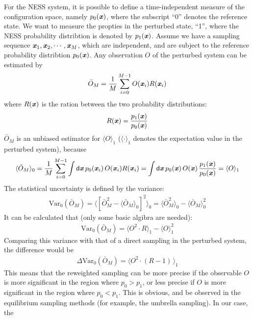 \documentclass[aip,jcp,a4paper,reprint,onecolumn]{revtex4-1}
\newcommand{\vect}[1]{\textbf{\textit{#1}}}
\newcommand{\dd}{\textsf{d}}
\begin{document}
For the NESS system, it is possible to define a time-independent
measure of the configuration space, namely $p_0(\vect x)$, where
the subscript ``0'' denotes the reference state. We want to measure
the propties in the perturbed state, ``1'', where the NESS
probability distribtion is denoted by $p_1(\vect x)$. Assume we have
a sampling sequence $\vect x_1, \vect x_2, \cdots, \vect x_M$, which
are independent, and are subject to the reference probability distribtion
$p_0(\vect x)$. Any  observation $O$ of the perturbed system can be
estimated by
\begin{align}
  \bar O_M = \frac 1M\sum_{i=0}^{M-1} O(\vect x_i) R(\vect x_i)
\end{align}
where $R(\vect x)$ is the ration between the two probability distributions:
\begin{align}
  R(\vect x) = \frac{p_1(\vect x)}{p_0(\vect x)}
\end{align}
$\bar O_M$ is an unbiased estimator for $\langle O\rangle_1$
($\langle \cdot\rangle_1$ denotes the expectation value in the perturbed
system), because
\begin{align}
  \langle \bar O_M\rangle_0
  = \frac 1M\sum_{i=0}^{M-1}
  \int\dd \vect x\, p_0(\vect x_i)\,O(\vect x_i) R(\vect x_i)
  = \int \dd \vect x\,p_0(\vect x)\,O(\vect x)
  \,\frac{p_1(\vect x)}{p_0(\vect x)}
  = \langle O\rangle_1
\end{align}
The statistical uncertainty is defined by the variance:
\begin{align}
  \textrm{Var}_0(\bar O_M)
  = \big\langle
  [\bar O_M^2 - \langle \bar O_M\rangle_0]^2
  \big\rangle_0
  = \langle\bar O_M^2\rangle_0 -
  \langle\bar O_M\rangle_0^2 
\end{align}
It can be calculated that (only some basic algibra are needed):
\begin{align}
  \textrm{Var}_0(\bar O_M)
  =
  \langle O^2\cdot R\rangle_1 - \langle O\rangle_1^2
\end{align}
Comparing this variance with that of a direct sampling in the perturbed system,
the difference would be
\begin{align}
  \Delta\textrm{Var}_0(\bar O_M)
  =
  \langle O^2\cdot (R-1)\,\rangle_1
\end{align}
This means that the reweighted sampling can be more precise if the
observable $O$ is more significant in the region where $p_0 > p_1$, or
less precise if $O$ is more significant in the region where $p_0 <
p_1$.  This is obvious, and be observed in the equilibrium sampling
methods (for example, the umbrella sampling).  In our case, the
\end{document}
